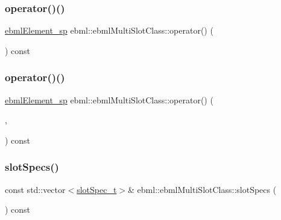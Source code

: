 \subsubsection{\texorpdfstring{operator()()}{operator()()}\hspace{0.1cm}{\footnotesize\ttfamily [5/6]}}
{\footnotesize\ttfamily \mbox{\hyperlink{namespaceebml_adad533b7705a16bb360fe56380c5e7be}{ebml\+Element\+\_\+sp}} ebml\+::ebml\+Multi\+Slot\+Class\+::operator() (\begin{DoxyParamCaption}\item[{\mbox{\hyperlink{namespaceebml_a4317d4c495715eced3ed448c2d05caeb}{slot\+Arg\+\_\+d}} \&\&}]{ }\end{DoxyParamCaption}) const}

\mbox{\label{classebml_1_1ebmlMultiSlotClass_a22f33854de534b0cee9c7e2fe8d3be00}} 
\subsubsection{\texorpdfstring{operator()()}{operator()()}\hspace{0.1cm}{\footnotesize\ttfamily [6/6]}}
{\footnotesize\ttfamily \mbox{\hyperlink{namespaceebml_adad533b7705a16bb360fe56380c5e7be}{ebml\+Element\+\_\+sp}} ebml\+::ebml\+Multi\+Slot\+Class\+::operator() (\begin{DoxyParamCaption}\item[{\mbox{\hyperlink{namespaceebml_ae432575dfbb3e141ce897442794f0ca5}{slot\+Arg\+\_\+l}} \&\&}]{,  }\item[{\mbox{\hyperlink{namespaceebml_a4317d4c495715eced3ed448c2d05caeb}{slot\+Arg\+\_\+d}} \&\&}]{ }\end{DoxyParamCaption}) const}

\mbox{\label{classebml_1_1ebmlMultiSlotClass_a8c0a510fb0de82566caa77d27127937c}} 
\subsubsection{\texorpdfstring{slot\+Specs()}{slotSpecs()}}
{\footnotesize\ttfamily const std\+::vector$<$\mbox{\hyperlink{classebml_1_1slotSpec__t}{slot\+Spec\+\_\+t}}$>$\& ebml\+::ebml\+Multi\+Slot\+Class\+::slot\+Specs (\begin{DoxyParamCaption}{ }\end{DoxyParamCaption}) const}

